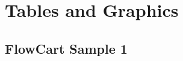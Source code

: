 \documentclass[../main.tex]{subfiles}
\begin{document}
\section{Tables and Graphics}
\subsection{FlowCart Sample 1}
\lipsum[1-2]
%
%
%
%
%
%
%
%
%
%
%
%
%
%
%
%
%
%
%
%
%
%
%
%
%
\end{document}
